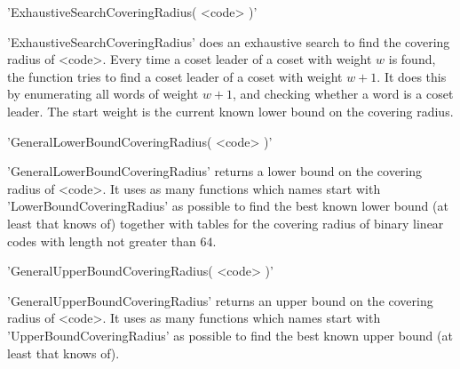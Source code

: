 

'ExhaustiveSearchCoveringRadius( <code> )'

'ExhaustiveSearchCoveringRadius' does an exhaustive search to find the covering
radius of <code>.
Every time a coset leader of a coset with weight $w$ is found,
the function tries to find a coset leader of a coset with weight $w+1$.
It does this by enumerating all words of weight $w+1$, and checking
whether a word is a coset leader.
The start weight is the current known lower bound on the
covering radius.




'GeneralLowerBoundCoveringRadius( <code> )'

'GeneralLowerBoundCoveringRadius' returns a lower bound on the
covering radius of <code>.
It uses as many functions which names start with 'LowerBoundCoveringRadius'
as possible to find the best known lower bound (at least that
\GUAVA{} knows of) together with
tables for the covering radius of binary linear codes with length
not greater than $64$.




'GeneralUpperBoundCoveringRadius( <code> )'

'GeneralUpperBoundCoveringRadius' returns an upper bound on the
covering radius of <code>.
It uses as many functions which names start with
'UpperBoundCoveringRadius' as possible to find the best known
upper bound (at least that \GUAVA{} knows of).




